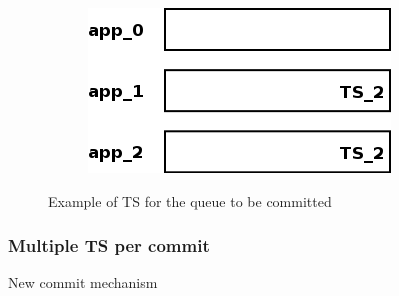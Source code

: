 \begin{figure}
\begin{subfigure}[t]{0.3\textwidth}
    \caption{}
    \label{fig:impl_tx_aggr_sub3}
  \end{subfigure}
  \qquad
  \begin{subfigure}[t]{0.3\textwidth}
    \includegraphics[scale=0.4]{resources/images/Implementation/commit_system_4.png}
    \caption{}
    \label{fig:impl_tx_aggr_sub4}
  \end{subfigure}

  \caption{Example of TS for the queue to be committed}
  \label{fig:impl_tx_aggr_queue}
\end{figure}

\subsubsection{Multiple TS per commit}
\label{sssec:impl_aggr_new}
New commit mechanism